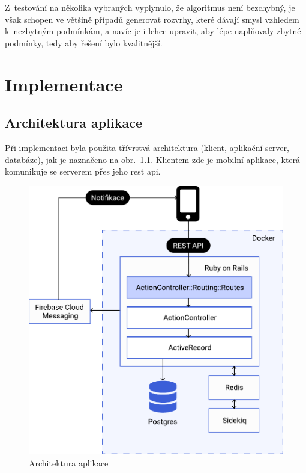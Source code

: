 \documentclass[a4paper,11pt,openany,twoside]{book}
\begin{document}
Z~testování na několika vybraných  vyplynulo, že algoritmus není bezchybný, je však schopen ve většině případů generovat rozvrhy, které dávají smysl vzhledem k~nezbytným podmínkám, a navíc je i lehce upravit, aby lépe naplňovaly zbytné podmínky, tedy aby řešení bylo kvalitnější.

\chapter{Implementace}

\section{Architektura aplikace}

Při implementaci byla použita třívrstvá architektura (klient, aplikační server, databáze), jak je naznačeno na obr.~\ref{fig:architecture}. Klientem zde je mobilní aplikace, která komunikuje se serverem přes jeho \acs{rest} \acs{api}.

\begin{figure}[h]
	\centering
	\includegraphics[scale=0.7]{img/architecture.pdf}
	\caption{Architektura aplikace}
	\label{fig:architecture}
\end{figure}
\end{document}
